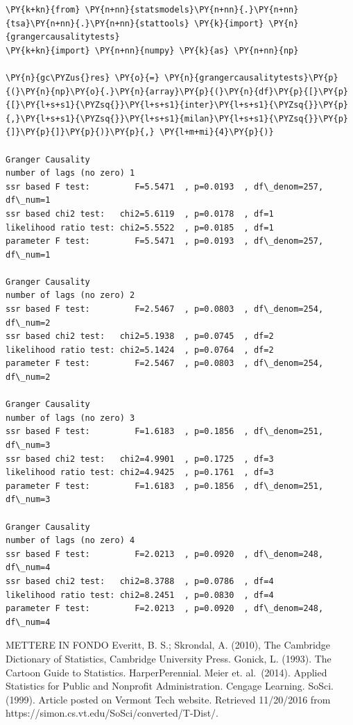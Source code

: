 \begin{codebox}[breakable, size=fbox, boxrule=1pt, pad at break*=1mm,colback=cellbackground, colframe=cellborder]
\begin{Verbatim}[commandchars=\\\{\}]
\PY{k+kn}{from} \PY{n+nn}{statsmodels}\PY{n+nn}{.}\PY{n+nn}{tsa}\PY{n+nn}{.}\PY{n+nn}{stattools} \PY{k}{import} \PY{n}{grangercausalitytests}
\PY{k+kn}{import} \PY{n+nn}{numpy} \PY{k}{as} \PY{n+nn}{np}

\PY{n}{gc\PYZus{}res} \PY{o}{=} \PY{n}{grangercausalitytests}\PY{p}{(}\PY{n}{np}\PY{o}{.}\PY{n}{array}\PY{p}{(}\PY{n}{df}\PY{p}{[}\PY{p}{[}\PY{l+s+s1}{\PYZsq{}}\PY{l+s+s1}{inter}\PY{l+s+s1}{\PYZsq{}}\PY{p}{,}\PY{l+s+s1}{\PYZsq{}}\PY{l+s+s1}{milan}\PY{l+s+s1}{\PYZsq{}}\PY{p}{]}\PY{p}{]}\PY{p}{)}\PY{p}{,} \PY{l+m+mi}{4}\PY{p}{)}

Granger Causality
number of lags (no zero) 1
ssr based F test:         F=5.5471  , p=0.0193  , df\_denom=257, df\_num=1
ssr based chi2 test:   chi2=5.6119  , p=0.0178  , df=1
likelihood ratio test: chi2=5.5522  , p=0.0185  , df=1
parameter F test:         F=5.5471  , p=0.0193  , df\_denom=257, df\_num=1

Granger Causality
number of lags (no zero) 2
ssr based F test:         F=2.5467  , p=0.0803  , df\_denom=254, df\_num=2
ssr based chi2 test:   chi2=5.1938  , p=0.0745  , df=2
likelihood ratio test: chi2=5.1424  , p=0.0764  , df=2
parameter F test:         F=2.5467  , p=0.0803  , df\_denom=254, df\_num=2

Granger Causality
number of lags (no zero) 3
ssr based F test:         F=1.6183  , p=0.1856  , df\_denom=251, df\_num=3
ssr based chi2 test:   chi2=4.9901  , p=0.1725  , df=3
likelihood ratio test: chi2=4.9425  , p=0.1761  , df=3
parameter F test:         F=1.6183  , p=0.1856  , df\_denom=251, df\_num=3

Granger Causality
number of lags (no zero) 4
ssr based F test:         F=2.0213  , p=0.0920  , df\_denom=248, df\_num=4
ssr based chi2 test:   chi2=8.3788  , p=0.0786  , df=4
likelihood ratio test: chi2=8.2451  , p=0.0830  , df=4
parameter F test:         F=2.0213  , p=0.0920  , df\_denom=248, df\_num=4
\end{Verbatim}
\end{codebox}

METTERE IN FONDO Everitt, B. S.; Skrondal, A. (2010), The Cambridge
Dictionary of Statistics, Cambridge University Press. Gonick, L. (1993).
The Cartoon Guide to Statistics. HarperPerennial. Meier et. al.~(2014).
Applied Statistics for Public and Nonprofit Administration. Cengage
Learning. SoSci. (1999). Article posted on Vermont Tech website.
Retrieved 11/20/2016 from
https://simon.cs.vt.edu/SoSci/converted/T-Dist/.